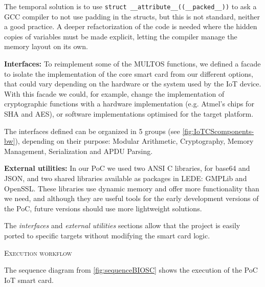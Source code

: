 The temporal solution is to use \texttt{struct \_\_attribute\_\_((\_\_packed\_\_))} to ask a GCC compiler to not use padding in the structs, but this is not standard, neither a good practice. A deeper refactorization of the code is needed where the hidden copies of variables must be made explicit, letting the compiler manage the memory layout on its own.

\hfil

\textbf{Interfaces:} To reimplement some of the MULTOS functions, we defined a facade to isolate the implementation of the core smart card from our different options, that could vary depending on the hardware or the system used by the IoT device.
With this facade we could, for example, change the implementation of cryptographic functions with a hardware implementation (e.g. Atmel's chips for SHA and AES), or software implementations optimised for the target platform.

The interfaces defined can be organized in 5 groups (see \autoref{fig:IoTCScomponents-bw}), depending on their purpose: Modular Arithmetic, Cryptography, Memory Management, Serialization and APDU Parsing.

\hfil

\textbf{External utilities:} In our PoC we used two ANSI C libraries, for base64 and JSON, and two shared libraries available as packages in LEDE: GMPLib and OpenSSL. These libraries use dynamic memory and offer more functionality than we need, and although they are useful tools for the early development versions of the PoC, future versions should use more lightweight solutions.

\hfil

The \textit{interfaces} and \textit{external utilities} sections  allow that the project is easily ported to specific targets without modifying the smart card logic.


\hfil

\textsc{Execution workflow}

The sequence diagram from \autoref{fig:sequenceBIOSC} shows the execution of the PoC IoT smart card.



